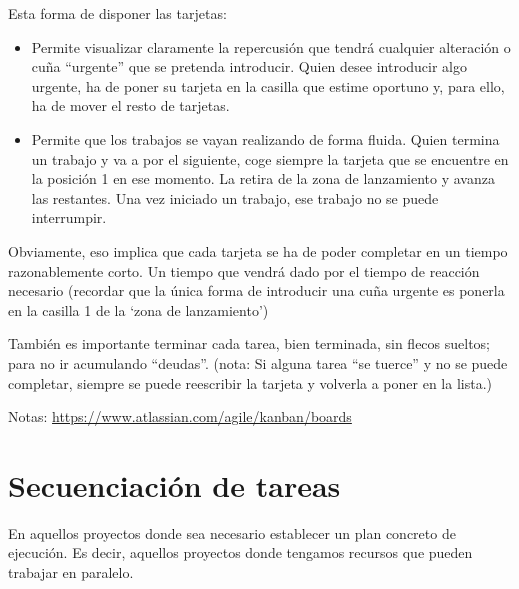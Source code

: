 \documentclass[spanish,12pt,a4paper,final,oneside]{book}
\begin{document}
Esta forma de disponer las tarjetas:
\begin{itemize}
\item Permite visualizar claramente la repercusión que tendrá cualquier alteración o cuña ``urgente'' que se pretenda introducir. Quien desee introducir algo urgente, ha de poner su tarjeta en la casilla que estime oportuno y, para ello, ha de mover el resto de tarjetas.
\item Permite que los trabajos se vayan realizando de forma fluida. Quien termina un trabajo y va a por el siguiente, coge siempre la tarjeta que se encuentre en la posición 1 en ese momento. La retira de la zona de lanzamiento y avanza las restantes. Una vez iniciado un trabajo, ese trabajo no se puede interrumpir. 
\end{itemize}

Obviamente, eso implica que cada tarjeta se ha de poder completar en un tiempo razonablemente corto. Un tiempo que vendrá dado por el tiempo de reacción necesario (recordar que la única forma de introducir una cuña urgente es ponerla en la casilla 1 de la `zona de lanzamiento')

También es importante terminar cada tarea, bien terminada, sin flecos sueltos; para no ir acumulando ``deudas''. (nota: Si alguna tarea ``se tuerce'' y no se puede completar, siempre se puede reescribir la tarjeta y volverla a poner en la lista.)

Notas:
\url{https://www.atlassian.com/agile/kanban/boards}

\section{Secuenciación de tareas}
En aquellos proyectos donde sea necesario establecer un plan concreto de ejecución. Es decir, aquellos proyectos donde tengamos recursos que pueden trabajar en paralelo. 
\end{document}

